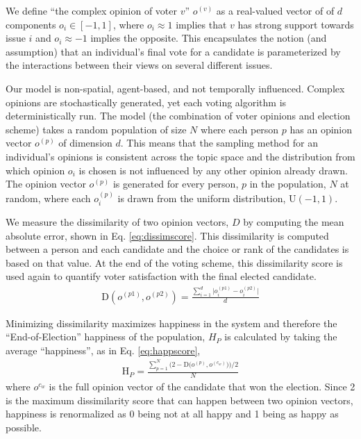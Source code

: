 We define ``the complex opinion of voter $v$'' $o^{(v)}$ as a real-valued vector of of $d$ components $o_{i} \in [-1,1]$, where $o_{i} \approx 1$ implies that $v$ has strong support towards issue $i$ and $o_{i} \approx -1$ implies the opposite. 
This encapsulates the notion (and assumption) that an individual's final vote for a candidate is parameterized by the interactions
between their views on several different issues.

Our model is non-spatial, agent-based, and not temporally influenced.
Complex opinions are stochastically generated, yet each voting algorithm is deterministically run.
The model (the combination of voter opinions and election scheme) takes a random population of size $N$ where each person $p$ 
has an opinion vector $o^{(p)}$ of dimension $d$.
This means that the sampling method for an individual's opinions is consistent across the topic space and the distribution from which opinion $o_i$ is chosen is not influenced by any other opinion already drawn.
The opinion vector $o^{(p)}$ is generated for every person, $p$ in the population, $N$ at random, where each $o^{(p)}_i$ is drawn from the uniform distribution, U$(-1,1)$.

We measure the dissimilarity of two opinion vectors, $D$ by computing the mean absolute error, shown in Eq. \ref{eq:dissimscore}.
This dissimilarity is computed between a person and each candidate and the choice or rank of the candidates is based on that value.
At the end of the voting scheme, this dissimilarity score is used again to quantify voter satisfaction with the final elected candidate.
\begin{align}
\text{D}(o^{(p1)},o^{(p2)}) = \frac{\sum_{i=1}^{d}\Big|o^{(p1)}_i - o^{(p2)}_i\Big|}{d}
\label{eq:dissimscore}
\end{align}

Minimizing dissimilarity maximizes happiness in the system and therefore the ``End-of-Election'' happiness of the population, $H_P$ is calculated by taking the average ``happiness'', as in Eq. \ref{eq:happscore},
\begin{align}
\text{H}_{P} =
\frac{\sum_{p=1}^{N} \Big(2 - \text{D} \big(o^{(p)},o^{(c_w)}\big)\Big) / 2 }{N}
\label{eq:happscore}
\end{align}
where $o^{c_w}$ is the full opinion vector of the candidate that won the election.
Since 2 is the maximum dissimilarity score that can happen between two opinion vectors, happiness is renormalized as 0 being not at all happy and 1 being as happy as possible.

